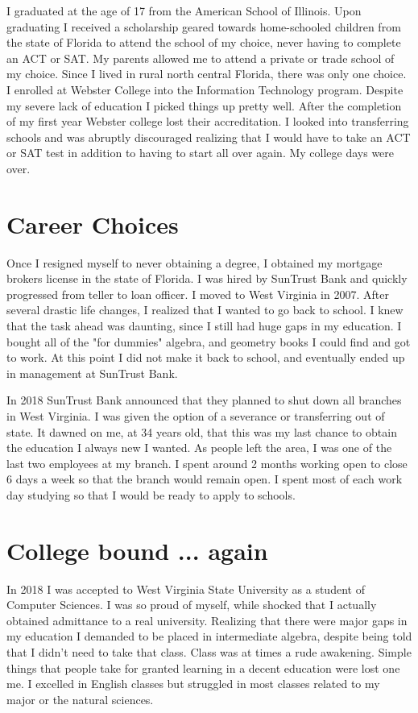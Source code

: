 \documentclass[oneside]{book}
\begin{document}
I graduated at the age of 17 from the American School of Illinois. Upon graduating I received a scholarship geared towards home-schooled children from the state of Florida to attend the school of my choice, never having to complete an ACT or SAT. My parents allowed me to attend a private or trade school of my choice. Since I lived in rural north central Florida, there was only one choice. I enrolled at Webster College into the Information Technology program. Despite my severe lack of education I picked things up pretty well. After the completion of my first year Webster college lost their accreditation. I looked into transferring schools and was abruptly discouraged realizing that I would have to take an ACT or SAT test in addition to having to start all over again. My college days were over. 

\section{Career Choices}

Once I resigned myself to never obtaining a degree, I obtained my mortgage brokers license in the state of Florida. I was hired by SunTrust Bank and quickly progressed from teller to loan officer. I moved to West Virginia in 2007. After several drastic life changes, I realized that I wanted to go back to school. I knew that the task ahead was daunting, since I still had huge gaps in my education. I bought all of the "for dummies" algebra, and geometry books I could find and got to work. At this point I did not make it back to school, and eventually ended up in management at SunTrust Bank. 

In 2018 SunTrust Bank announced that they planned to shut down all branches in West Virginia. I was given the option of a severance or transferring out of state. It dawned on me, at 34 years old, that this was my last chance to obtain the education I always new I wanted. As people left the area, I was one of the last two employees at my branch. I spent around 2 months working open to close 6 days a week so that the branch would remain open. I spent most of each work day studying so that I would be ready to apply to schools. 

\section{College bound ... again}

In 2018 I was accepted to West Virginia State University as a student of Computer Sciences. I was so proud of myself, while shocked that I actually obtained admittance to a real university. Realizing that there were major gaps in my education I demanded to be placed in intermediate algebra, despite being told that I didn't need to take that class. Class was at times a rude awakening. Simple things that people take for granted learning in a decent education were lost one me. I excelled in English classes but struggled in most classes related to my major or the natural sciences. 
\end{document}
